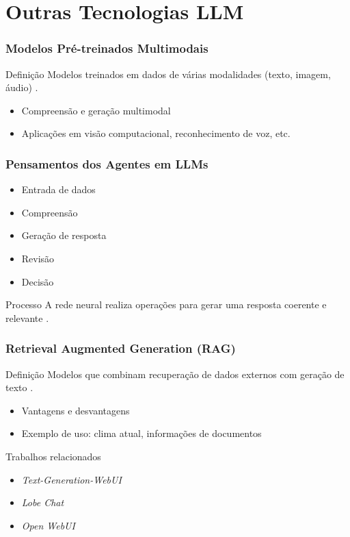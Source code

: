 \documentclass{beamer}
\begin{document}
\section{Outras Tecnologias LLM}
\begin{frame}
    \frametitle{Modelos Pré-treinados Multimodais}
    \begin{block}{Definição}
        Modelos treinados em dados de várias modalidades (texto, imagem, áudio) \cite{radford2021learning}.
    \end{block}
    \begin{itemize}
        \item Compreensão e geração multimodal
        \item Aplicações em visão computacional, reconhecimento de voz, etc.
    \end{itemize}
\end{frame}

\begin{frame}
    \frametitle{Pensamentos dos Agentes em LLMs}
    \begin{itemize}
        \item Entrada de dados
        \item Compreensão
        \item Geração de resposta
        \item Revisão
        \item Decisão
    \end{itemize}
    \begin{block}{Processo}
        A rede neural realiza operações para gerar uma resposta coerente e relevante \cite{NEURIPS2020_1457c0d6}.
    \end{block}
\end{frame}

\begin{frame}
    \frametitle{Retrieval Augmented Generation (RAG)}
    \begin{block}{Definição}
        Modelos que combinam recuperação de dados externos com geração de texto \cite{lewis2020retrieval}.
    \end{block}
    \begin{itemize}
        \item Vantagens e desvantagens
        \item Exemplo de uso: clima atual, informações de documentos
    \end{itemize}
\end{frame}
\begin{frame}[allowframebreaks]{Trabalhos relacionados}
    
    \begin{itemize}
    \item \textit{Text-Generation-WebUI} \cite{text-generation-webui}
    \item \textit{Lobe Chat} \cite{Lobe-Chat}
    \item \textit{Open WebUI}\cite{open-webui}
\end{itemize}    


\end{frame}
\end{document}

